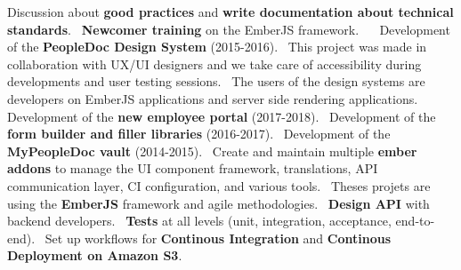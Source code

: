 \documentclass{moderncv}
\begin{document}
{	Discussion about \textbf{good practices} and \textbf{write documentation about technical standards}.\newline~
	\textbf{Newcomer training} on the EmberJS framework.\newline~
	\newline~
	Development of the \textbf{PeopleDoc Design System} (2015-2016).\newline~
	This project was made in collaboration with UX/UI designers and we take care of accessibility during developments and user testing sessions.\newline~
	The users of the design systems are developers on EmberJS applications and server side rendering applications.\newline~
	\newline~
	Development of the \textbf{new employee portal} (2017-2018).\newline~
	Development of the \textbf{form builder and filler libraries} (2016-2017).\newline~
	Development of the \textbf{MyPeopleDoc vault} (2014-2015).\newline~
	Create and maintain multiple \textbf{ember addons} to manage the UI component framework, translations, API communication layer, CI configuration, and various tools.\newline~
	Theses projets are using the \textbf{EmberJS} framework and agile methodologies.\newline~
	\textbf{Design API} with backend developers.\newline~
	\textbf{Tests} at all levels (unit, integration, acceptance, end-to-end).\newline~
	Set up workflows for \textbf{Continous Integration} and \textbf{Continous Deployment on Amazon S3}.
}

\end{document}
